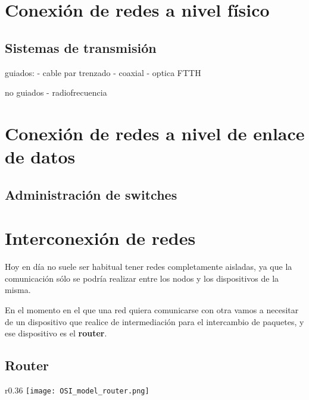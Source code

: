 \chapter{Conexión de redes a nivel físico}



\hypertarget{sistemas_transmision}{}
\section{Sistemas de transmisión}

guiados:
- cable par trenzado
- coaxial
- optica
FTTH

no guiados
- radiofrecuencia



\chapter{Conexión de redes a nivel de enlace de datos}


\section{Administración de switches}



\chapter{Interconexión de redes}
Hoy en día no suele ser habitual tener redes completamente aisladas, ya que la comunicación sólo se podría realizar entre los nodos y los dispositivos de la misma.

En el momento en el que una red quiera comunicarse con otra vamos a necesitar de un dispositivo que realice de intermediación para el intercambio de paquetes, y ese dispositivo es el \textbf{router}.

\section{Router}

\begin{wrapfigure}{r}{0.36\linewidth}
    \centering
    \vspace{-20pt}
    \texttt{[image: OSI\_model\_router.png]}
    \vspace{-32pt}
    \vspace{-10pt}
\end{wrapfigure}

